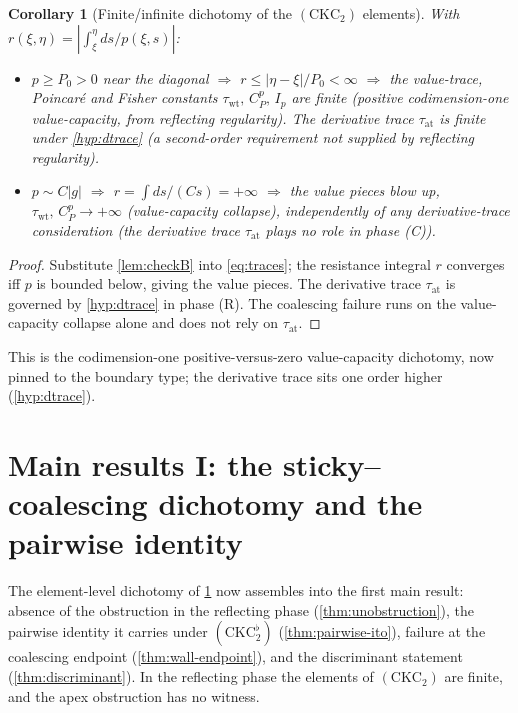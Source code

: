 \documentclass[reqno,final,11pt]{amsart}
\theoremstyle{plain}
\newtheorem{corollary}[theorem]{Corollary}
\theoremstyle{definition}
\theoremstyle{remark}
\newcommand{\CKC}{(\mathrm{CKC}_{2})}
\begin{document}
\begin{corollary}[Finite/infinite dichotomy of the $\CKC$ elements]\label{cor:dichotomy}
With $r(\xi,\eta)=|\int_\xi^\eta ds/p(\xi,s)|$:
\begin{itemize}
\item[\textnormal{(R)}] $p\ge P_0>0$ near the diagonal $\Rightarrow$
$r\le|\eta-\xi|/P_0<\infty$ $\Rightarrow$ the value-trace, Poincar\'e and
Fisher constants $\tau_{\mathrm{wt}},\,C^p_P,\,I_p$ are finite
(positive codimension-one value-capacity, from reflecting regularity).
The derivative trace $\tau_{\mathrm{at}}$ is finite under \cref{hyp:dtrace} (a second-order requirement not supplied by
reflecting regularity).
\item[\textnormal{(C)}] $p\sim C|g|$ $\Rightarrow$ $r=\int ds/(Cs)=+\infty$
$\Rightarrow$ the value pieces blow up, $\tau_{\mathrm{wt}},\,C^p_P\to+\infty$
(value-capacity collapse), independently of any derivative-trace
consideration (the derivative trace $\tau_{\mathrm{at}}$ plays no role in phase
(C)).
\end{itemize}
\end{corollary}
\begin{proof}
Substitute \cref{lem:checkB} into \eqref{eq:traces}; the resistance integral
$r$ converges iff $p$ is bounded below, giving the value pieces. The derivative
trace $\tau_{\mathrm{at}}$ is governed by \cref{hyp:dtrace} in phase (R). The
coalescing failure runs on the value-capacity collapse alone and does not rely
on $\tau_{\mathrm{at}}$.
\end{proof}

This is the codimension-one positive-versus-zero value-capacity
dichotomy, now pinned to the boundary type; the derivative trace sits one order
higher (\cref{hyp:dtrace}).

\section{Main results I: the sticky--coalescing dichotomy and the pairwise identity}\label{sec:main}

The element-level dichotomy of \cref{cor:dichotomy} now assembles into the
first main result: absence of the obstruction in the reflecting phase
(\cref{thm:unobstruction}), the pairwise identity it carries under $(\mathrm{CKC}_2^{\flat})$
(\cref{thm:pairwise-ito}), failure at the coalescing endpoint
(\cref{thm:wall-endpoint}), and the discriminant statement
(\cref{thm:discriminant}). In the reflecting phase the elements of $\CKC$
are finite, and the apex obstruction has no witness.
\end{document}
